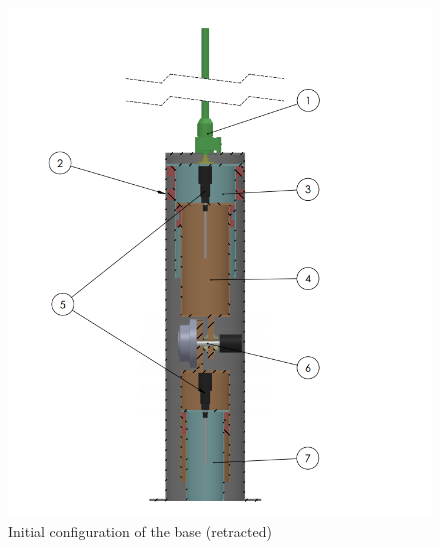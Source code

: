 \begin{figure}[h!]
\centering
	\includegraphics[width=\columnwidth]{figs/estudo/solid/Base_Recolhida.PNG} 
	\caption{Initial configuration of the base (retracted)}
	\label{fig::base_recolhida}
\end{figure}

